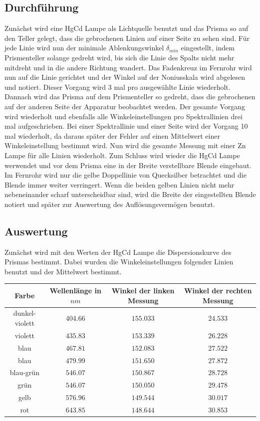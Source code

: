 \documentclass[a4paper, 11pt]{article}
\begin{document}
\subsection{Durchführung}
Zunächst wird eine HgCd Lampe als Lichtquelle benutzt und das Prisma so auf den Teller gelegt, dass die gebrochenen Linien auf einer Seite zu sehen sind. Für jede Linie wird nun der minimale Ablenkungswinkel $\delta_{min}$ eingestellt, indem Prismenteller solange gedreht wird, bis sich die Linie des Spalts nicht mehr mitdreht und in die andere Richtung wandert. Das Fadenkreuz im Fernrohr wird nun auf die Linie gerichtet und der Winkel auf der Noniusskala wird abgelesen und notiert. Dieser Vorgang wird 3 mal pro ausgewählte Linie wiederholt. Dannach wird das Prisma auf dem Prismenteller so gedreht, dass die gebrochenen auf der anderen Seite der Apparatur beobachtet werden. Der gesamte Vorgang wird wiederholt und ebenfalls alle Winkeleinstellungen pro Spektrallinien drei mal aufgeschrieben. Bei einer Spektrallinie und einer Seite wird der Vorgang 10 mal wiederholt, da daraus später der Fehler auf einen Mittelwert einer Winkeleinstellung bestimmt wird.\newline
Nun wird die gesamte Messung mit einer Zn Lampe für alle Linien wiederholt. 
Zum Schluss wird wieder die HgCd Lampe werwendet und vor dem Prisma eine in der Breite verstellbare Blende eingebaut. Im Fernrohr wird nur die gelbe Doppellinie von Quecksilber betrachtet und die Blende immer weiter verringert. Wenn die beiden gelben Linien nicht mehr nebeneinander scharf unterscheidbar sind, wird die Breite der eingestellten Blende notiert und später zur Auswertung des Auflösungsvermögen benutzt.

\subsection{Auswertung}
Zunächst wird mit den Werten der HgCd Lampe die Dispersionskurve des Prismas bestimmt.
Dabei wurden die Winkeleinstellungen folgender Linien benutzt und der Mittelwert bestimmt.
\begin{center}

\begin{tabular}{|c|c|c|c|}
\hline Farbe & Wellenlänge in $nm$ & Winkel der linken Messung& Winkel der rechten Messung \\
\hline dunkel-violett& $404.66$ &$155.033 $&$24.533 $\\
\hline violett &   $435.83$ &$153.339 $&$ 26.228$\\
\hline blau &       $467.81$ &$152.083 $&$ 27.522$\\
\hline blau&   $479.99$ &$151.650 $&$27.872 $\\
\hline blau-grün & $546.07$ &$150.867 $&$28.728 $\\
\hline grün &  $546.07$ &$150.050 $&$29.478 $\\
\hline gelb &   $576.96$ &$ 149.544$&$ 30.017$\\
\hline rot & $643.85$ &$148.644 $&$30.853 $\\
\hline 
\end{tabular}
\end{center}
\end{document}
